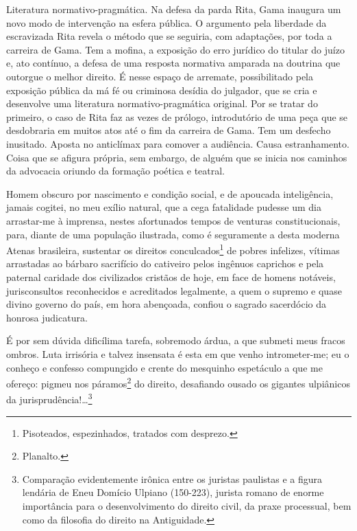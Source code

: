 \begin{didascalia}
Literatura normativo-pragmática. Na defesa da parda Rita, Gama inaugura
um novo modo de intervenção na esfera pública. O argumento pela
liberdade da escravizada Rita revela o método que se seguiria, com
adaptações, por toda a carreira de Gama. Tem a mofina, a exposição do
erro jurídico do titular do juízo e, ato contínuo, a defesa de uma
resposta normativa amparada na doutrina que outorgue o melhor direito. É
nesse espaço de arremate, possibilitado pela exposição pública da má fé
ou criminosa desídia do julgador, que se cria e desenvolve uma
literatura normativo-pragmática original. Por se tratar do primeiro, o
caso de Rita faz as vezes de prólogo, introdutório de uma peça que se
desdobraria em muitos atos até o fim da carreira de Gama. Tem um
desfecho inusitado. Aposta no anticlímax para comover a audiência. Causa
estranhamento. Coisa que se afigura própria, sem embargo, de alguém que
se inicia nos caminhos da advocacia oriundo da formação poética e
teatral.
\end{didascalia}



Homem obscuro por nascimento e condição social, e de apoucada
inteligência, jamais cogitei, no meu exílio natural, que a cega
fatalidade pudesse um dia arrastar-me à imprensa, nestes afortunados
tempos de venturas constitucionais, para, diante de uma população
ilustrada, como é seguramente a desta moderna Atenas brasileira,
sustentar os direitos conculcados\footnote{Pisoteados, espezinhados,
  tratados com desprezo.} de pobres infelizes, vítimas arrastadas ao
bárbaro sacrifício do cativeiro pelos ingênuos caprichos e pela paternal
caridade dos civilizados cristãos de hoje, em face de homens notáveis,
jurisconsultos reconhecidos e acreditados legalmente, a quem o supremo e
quase divino governo do país, em hora abençoada, confiou o sagrado
sacerdócio da honrosa judicatura.

É por sem dúvida dificílima tarefa, sobremodo árdua, a que submeti meus
fracos ombros. Luta irrisória e talvez insensata é esta em que venho
intrometer-me; eu o conheço e confesso compungido e crente do mesquinho
espetáculo a que me ofereço: pigmeu nos páramos\footnote{Planalto.} do
direito, desafiando ousado os gigantes ulpiânicos da
jurisprudência!\ldots{}\footnote{Comparação evidentemente irônica entre os
  juristas paulistas e a figura lendária de Eneu Domício Ulpiano
  (150-223), jurista romano de enorme importância para o desenvolvimento
  do direito civil, da praxe processual, bem como da filosofia do
  direito na Antiguidade.}

